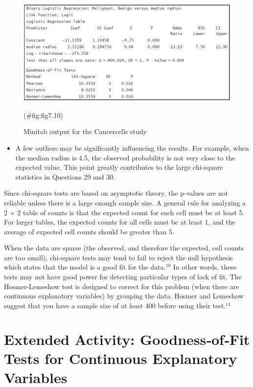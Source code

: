 \documentclass[
]{report}
\providecommand{\tightlist}{%
  \setlength{\itemsep}{0pt}\setlength{\parskip}{0pt}}
\begin{document}
\begin{figure}

{\centering \includegraphics[width=1\linewidth]{docs/Fig7_10MinitabLog} 

}

\caption{Minitab output for the Cancercells study}(\#fig:fig7.10)
\end{figure}

\begin{itemize}
\tightlist
\item
  A few outliers may be significantly influencing the results. For example, when the median radius is
  4.5, the observed probability is not very close to the expected value. This point greatly contributes to
  the large chi-square statistics in Questions 29 and 30.
\end{itemize}

Since chi-square tests are based on asymptotic theory, the p-values are not reliable unless there is a large
enough sample size. A general rule for analyzing a 2 \(\times\) 2 table of counts is that the expected count for each
cell must be at least 5. For larger tables, the expected counts for all cells must be at least 1, and the average
of expected cell counts should be greater than 5.

When the data are sparse (the observed, and therefore the expected, cell counts are too small), chi-square
tests may tend to fail to reject the null hypothesis which states that the model is a good fit for the data.\(^10\) In other
words, these tests may not have good power for detecting particular types of lack of fit. The Hosmer-Lemeshow
test is designed to correct for this problem (when there are continuous explanatory variables) by grouping
the data. Hosmer and Lemeshow suggest that you have a sample size of at least 400 before using their test.\(^11\)

\section*{Extended Activity: Goodness‐of‐Fit Tests for Continuous Explanatory Variables}\label{extended-activity-goodnessoffit-tests-for-continuous-explanatory-variables}
\end{document}
